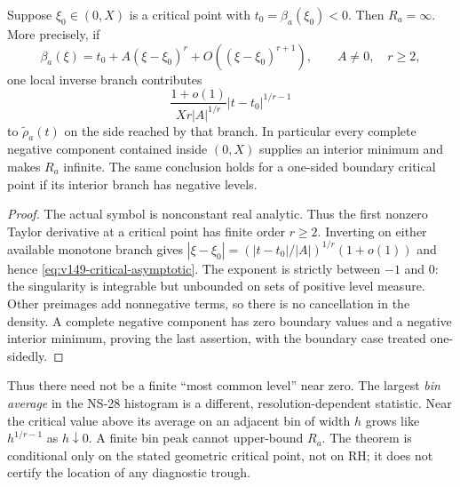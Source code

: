 \begin{proposition}
\label{prop:v149-critical-density}
Suppose $\xi_0\in(0,X)$ is a critical point with
$t_0=\beta_a(\xi_0)<0$. Then $R_a=\infty$. More precisely, if
\[
 \beta_a(\xi)=t_0+A(\xi-\xi_0)^r+O((\xi-\xi_0)^{r+1}),
 \qquad A\ne0,\quad r\ge2,
\]
one local inverse branch contributes
\begin{equation}\label{eq:v149-critical-asymptotic}
 \frac{1+o(1)}{Xr|A|^{1/r}}
               |t-t_0|^{1/r-1}
\end{equation}
to $\widetilde\rho_a(t)$ on the side reached by that branch.
In particular every complete negative component contained inside
$(0,X)$ supplies an interior minimum and makes $R_a$ infinite.
The same conclusion holds for a one-sided boundary critical point if
its interior branch has negative levels.
\end{proposition}
\begin{proof}
The actual symbol is nonconstant real analytic. Thus the first nonzero
Taylor derivative at a critical point has finite order $r\ge2$.
Inverting on either available monotone branch gives
$|\xi-\xi_0|=(|t-t_0|/|A|)^{1/r}(1+o(1))$ and hence
\eqref{eq:v149-critical-asymptotic}. The exponent is strictly between
$-1$ and $0$: the singularity is integrable but unbounded on sets of
positive level measure. Other preimages add nonnegative terms, so
there is no cancellation in the density. A complete negative component
has zero boundary values and a negative interior minimum, proving the
last assertion, with the boundary case treated one-sidedly.
\end{proof}

Thus there need not be a finite ``most common level'' near zero. The
largest \emph{bin average} in the NS-28 histogram is a different,
resolution-dependent statistic. Near the critical value above its
average on an adjacent bin of width $h$ grows like $h^{1/r-1}$ as
$h\downarrow0$. A finite bin peak cannot upper-bound $R_a$. The theorem
is conditional only on the stated geometric critical point, not on RH;
it does not certify the location of any diagnostic trough.

